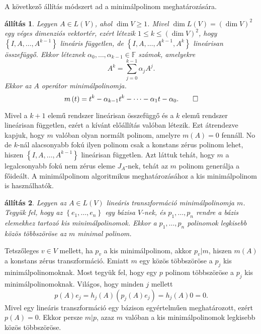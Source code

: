 \documentclass[9pt, a4paper, showtrims]{memoir}
\makeatletter
\renewenvironment{proof}[1][\proofname]
    {\par\pushQED{\qed}%
    \normalfont \topsep6\p@\@plus6\p@\relax
    \trivlist
    \item[\hskip\labelsep
        \itshape
    #1\@addpunct{:}]\ignorespaces}
    {\popQED\endtrivlist\@endpefalse}
\theoremstyle{plain}
\newtheorem{proposition}{állítás}[chapter]
\theoremstyle{remark}
\theoremstyle{definition}
\makeatother
\begin{document}
    A következő állítás módszert ad a minimálpolinom meghatározására.
    \begin{proposition}
        Legyen $A\in L\left( V \right)$, ahol $\dim V\geq 1$.
        Mivel $\dim L\left( V \right)=\left( \dim V \right)^2$ egy véges dimenziós vektortér,
        ezért létezik $1\leq k \leq (\dim V)^2$,
        hogy 
        $\left\{ I,A,\dots,A^{k-1} \right\}$ lineáris független,
        de $\left\{ I,A,\dots,A^{k-1},A^{k} \right\}$ lineárisan összefüggő.
        Ekkor léteznek $\alpha_0,\dots,\alpha_{k-1}\in\mathbb{F}$
        számok, amelyekre
        \[
            A^{k}=\sum_{j=0}^{k-1}\alpha_jA^{j}.
        \]
        Ekkor az $A$ operátor minimálpolinomja.
        \[
            m\left( t \right)=
            t^k-\alpha_{k-1}t^k-\dots-\alpha_1t-\alpha_0.\qedhere
        \]
    \end{proposition} 
    \begin{proof}
        Mivel a $k+1$ elemű rendszer lineárisan összefüggő és a $k$ elemű rendszer lineárisan független, 
        ezért a kívánt előállítás valóban létezik.
        Ezt átrendezve kapjuk, hogy $m$ valóban olyan normált polinom, amelyre $m\left( A \right)=0$ fennáll.
        No de $k$-nál alacsonyabb fokú ilyen polinom csak a konstans zérus polinom lehet,
        hiszen $\left\{ I,A,\dots,A^{k-1} \right\}$ lineárisan független.
        Azt láttuk tehát, hogy $m$ a legalcsonyabb fokú nem zérus eleme $J_{A}$-nek,
        tehát az $m$ polinom generálja a főideált.
    \end{proof}
    A minimálpolinom algoritmikus meghatározásához a kis minimálpolinom is használhatók.
    \begin{proposition}
        Legyen az $A\in L\left( V \right)$ lineáris transzformáció minimálpolinomja $m$.
        Tegyük fel, hogy az $\left\{ e_1,\dots,e_n \right\}$ egy bázisa $V$-nek,
        és $p_1,\dots,p_n$ rendre a bázis elemekhez tartozó kis minimálpolinomok.
        Ekkor a $p_1,\dots,p_n$ polinomok legkisebb közös többszöröse az $m$ minimal polinom.
    \end{proposition}
    \begin{proof}
        Tetszőleges $v\in V$ mellett, ha $p_v$ a kis minimálpolinom,
        akkor $p_v|m$, hiszen $m\left( A \right)$ a konstans zérus transzformáció.
        Emiatt $m$ egy közös többszöröse a $p_j$ kis minimálpolinomoknak.
        Most tegyük fel, hogy egy $p$ polinom többszöröse a $p_j$ kis minimálpolinomoknak.
        Világos, hogy minden $j$ mellett
        \[
            p\left( A \right)e_j
            =
            h_j\left( A \right)\left( p_j\left( A \right)e_j \right)
            =
            h_j\left( A \right)0
            =
            0.
        \]
        Mivel egy lineáris transzformáció egy bázison egyértelműen meghatározott, ezért
        $p\left( A \right)=0$.
        Ekkor persze $m|p$, 
        azaz $m$ valóban  a kis minimálpolinomok legkisebb közös többszöröse.
    \end{proof}
\end{document}
